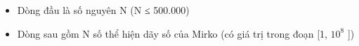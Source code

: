 \begin{itemize}
	\item     Dòng đầu là số nguyên N (N ≤ 500.000)   
	\item     Dòng sau gồm N số thể hiện dãy số của Mirko (có giá trị trong đoạn [1, $10^{8}$    ])    \textbf{}
\end{itemize}